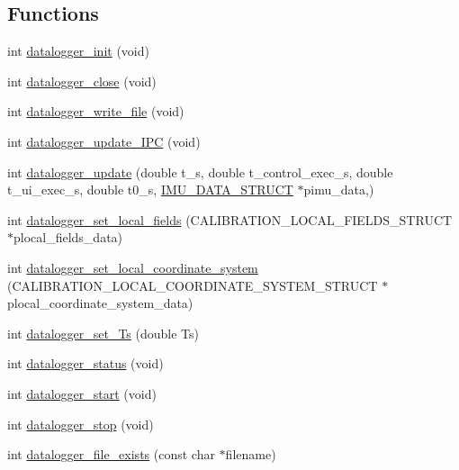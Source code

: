 \subsection*{Functions}
\begin{DoxyCompactItemize}
\item 
int \hyperlink{datalogger_01_07Caio-PC's_01conflicted_01copy_012012-11-23_08_8h_a1977ef253746fd8c008a3641d9822551}{datalogger\-\_\-init} (void)
\item 
int \hyperlink{datalogger_01_07Caio-PC's_01conflicted_01copy_012012-11-23_08_8h_ad22dbe9e235e7ae5737a23796d13ffbd}{datalogger\-\_\-close} (void)
\item 
int \hyperlink{datalogger_01_07Caio-PC's_01conflicted_01copy_012012-11-23_08_8h_a2aedecfce53e1935a41615ceaf378013}{datalogger\-\_\-write\-\_\-file} (void)
\item 
int \hyperlink{datalogger_01_07Caio-PC's_01conflicted_01copy_012012-11-23_08_8h_a25bb814a0877f419ae09b08cd7e91ee9}{datalogger\-\_\-update\-\_\-\-I\-P\-C} (void)
\item 
int \hyperlink{datalogger_01_07Caio-PC's_01conflicted_01copy_012012-11-23_08_8h_a360547e43bc240bf2ad44656dc70a590}{datalogger\-\_\-update} (double t\-\_\-s, double t\-\_\-control\-\_\-exec\-\_\-s, double t\-\_\-ui\-\_\-exec\-\_\-s, double t0\-\_\-s, \hyperlink{structIMU__DATA__STRUCT}{I\-M\-U\-\_\-\-D\-A\-T\-A\-\_\-\-S\-T\-R\-U\-C\-T} $\ast$pimu\-\_\-data,)
\item 
int \hyperlink{datalogger_01_07Caio-PC's_01conflicted_01copy_012012-11-23_08_8h_aedb2e01731eb308da0f3a664b29ff18d}{datalogger\-\_\-set\-\_\-local\-\_\-fields} (C\-A\-L\-I\-B\-R\-A\-T\-I\-O\-N\-\_\-\-L\-O\-C\-A\-L\-\_\-\-F\-I\-E\-L\-D\-S\-\_\-\-S\-T\-R\-U\-C\-T $\ast$plocal\-\_\-fields\-\_\-data)
\item 
int \hyperlink{datalogger_01_07Caio-PC's_01conflicted_01copy_012012-11-23_08_8h_ada9c5776313f813d446d1014822912ad}{datalogger\-\_\-set\-\_\-local\-\_\-coordinate\-\_\-system} (C\-A\-L\-I\-B\-R\-A\-T\-I\-O\-N\-\_\-\-L\-O\-C\-A\-L\-\_\-\-C\-O\-O\-R\-D\-I\-N\-A\-T\-E\-\_\-\-S\-Y\-S\-T\-E\-M\-\_\-\-S\-T\-R\-U\-C\-T $\ast$plocal\-\_\-coordinate\-\_\-system\-\_\-data)
\item 
int \hyperlink{datalogger_01_07Caio-PC's_01conflicted_01copy_012012-11-23_08_8h_afb69d166f8d53042825174cee225ea49}{datalogger\-\_\-set\-\_\-\-Ts} (double Ts)
\item 
int \hyperlink{datalogger_01_07Caio-PC's_01conflicted_01copy_012012-11-23_08_8h_a46fd1290d9ee97d5fc7171e1e0dcb0aa}{datalogger\-\_\-status} (void)
\item 
int \hyperlink{datalogger_01_07Caio-PC's_01conflicted_01copy_012012-11-23_08_8h_a1f254ef380d595d6605c10811fd0dee6}{datalogger\-\_\-start} (void)
\item 
int \hyperlink{datalogger_01_07Caio-PC's_01conflicted_01copy_012012-11-23_08_8h_aae2ffbc6cbf8f1cfecceb42c5139530a}{datalogger\-\_\-stop} (void)
\item 
int \hyperlink{datalogger_01_07Caio-PC's_01conflicted_01copy_012012-11-23_08_8h_a29bc3190cba1f225ad3b2eed899a6762}{datalogger\-\_\-file\-\_\-exists} (const char $\ast$filename)
\end{DoxyCompactItemize}


